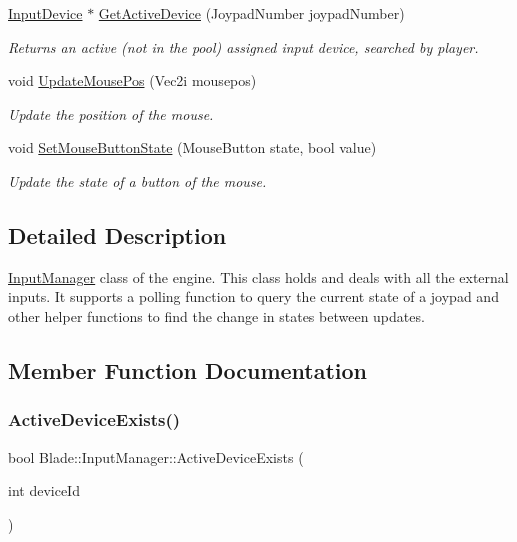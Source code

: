 \begin{DoxyCompactItemize}
\hyperlink{class_blade_1_1_input_device}{Input\+Device} $\ast$ \hyperlink{class_blade_1_1_input_manager_af7047c9533684d365fb3c61c10911c8c}{Get\+Active\+Device} (Joypad\+Number joypad\+Number)
\begin{DoxyCompactList}\small\item\em Returns an active (not in the pool) assigned input device, searched by player. \end{DoxyCompactList}\item 
void \hyperlink{class_blade_1_1_input_manager_a61209430d6682ade700cc9fa89c7f50e}{Update\+Mouse\+Pos} (Vec2i mousepos)
\begin{DoxyCompactList}\small\item\em Update the position of the mouse. \end{DoxyCompactList}\item 
void \hyperlink{class_blade_1_1_input_manager_a4670405f916ccabf83465154f3649d17}{Set\+Mouse\+Button\+State} (Mouse\+Button state, bool value)
\begin{DoxyCompactList}\small\item\em Update the state of a button of the mouse. \end{DoxyCompactList}\end{DoxyCompactItemize}


\subsection{Detailed Description}
\hyperlink{class_blade_1_1_input_manager}{Input\+Manager} class of the engine. This class holds and deals with all the external inputs. It supports a polling function to query the current state of a joypad and other helper functions to find the change in states between updates. 

\subsection{Member Function Documentation}
\mbox{\label{class_blade_1_1_input_manager_a6aadb5a4fd8ccfe2de69c1f2d62df37d}} 
\subsubsection{\texorpdfstring{Active\+Device\+Exists()}{ActiveDeviceExists()}}
{\footnotesize\ttfamily bool Blade\+::\+Input\+Manager\+::\+Active\+Device\+Exists (\begin{DoxyParamCaption}\item[{int}]{device\+Id }\end{DoxyParamCaption})}




